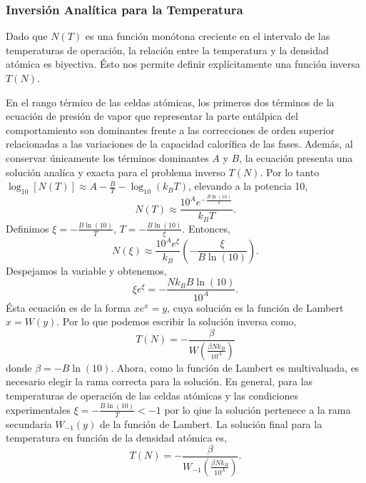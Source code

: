 \subsubsection{Inversión Analítica para la Temperatura}
Dado que $N(T)$ es una función monótona creciente en el intervalo de las temperaturas de operación, la relación entre la temperatura y la densidad atómica es biyectiva. Ésto nos permite definir explícitamente una función inversa $T(N)$.

En el rango térmico de las celdas atómicas, los primeros dos términos de la ecuación de presión de vapor que representar la parte entálpica del comportamiento son dominantes frente a las correcciones de orden superior relacionadas a las variaciones de la capacidad calorífica de las fases. Además, al conservar únicamente los términos dominantes $A$ y $B$, la ecuación presenta una solución analíca y exacta para el problema inverso $T(N)$. Por lo tanto $\log_{10} [N(T)] \approx A - \frac{B}{T} - \log_{10} (k_B T)$, elevando a la potencia 10,
\begin{equation}
    N(T) \approx \frac{10^{A} e^{-\frac{B \ln(10)}{T}}}{k_B T}.
\end{equation}
Definimos $\xi = - \frac{B \ln(10)}{T}$, $T = - \frac{B \ln(10)}{\xi}$. Entonces,
\begin{equation}
    N(\xi) \approx \frac{10^{A} e^{\xi}}{k_B} \left( -\frac{\xi}{B \ln(10)} \right).
\end{equation}
Despejamos la variable y obtenemos,
\begin{equation}
    \xi e^{\xi} = - \frac{N k_B B \ln(10)}{10^{A}}.
\end{equation}
Ésta ecuación es de la forma $x e^x = y$, cuya solución es la función de Lambert $x = W(y)$. Por lo que podemos escribir la solución inversa como,
\begin{equation}
    T(N) = - \frac{\beta}{W\left(\frac{\beta N k_B}{10^{A}}\right)}
\end{equation}
donde $\beta = -B\ln(10)$. Ahora, como la función de Lambert es multivaluada, es necesario elegir la rama correcta para la solución. En general, para las temperaturas de operación de las celdas atómicas y las condiciones experimentales $ \xi = - \frac{B \ln(10)}{T}  < -1$ por lo qiue la solución pertenece a la rama secundaria $W_{-1}(y)$ de la función de Lambert. La solución final para la temperatura en función de la densidad atómica es,
\begin{equation}
    \boxed{
    T(N) = - \frac{\beta}{W_{-1}\left(\frac{\beta N k_B}{10^{A}}\right)}.
    }
\end{equation}
